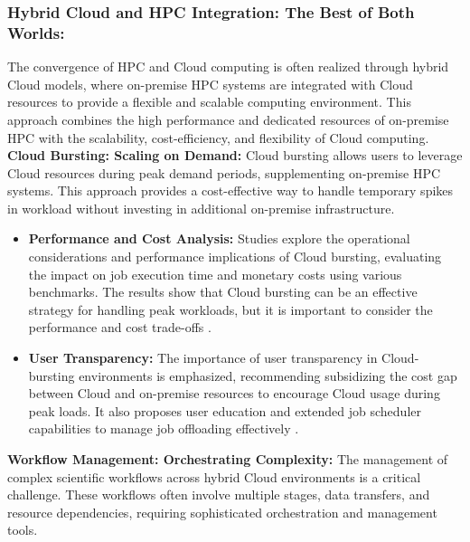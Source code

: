         





    \subsubsection{Hybrid Cloud and HPC Integration: The Best of Both Worlds:} The convergence of HPC and Cloud computing is often realized through hybrid Cloud models, where on-premise HPC systems are integrated with Cloud resources to provide a flexible and scalable computing environment. This approach combines the high performance and dedicated resources of on-premise HPC with the scalability, cost-efficiency, and flexibility of Cloud computing. \\
    \newline
    \textbf{Cloud Bursting: Scaling on Demand:} Cloud bursting allows users to leverage Cloud resources during peak demand periods, supplementing on-premise HPC systems. This approach provides a cost-effective way to handle temporary spikes in workload without investing in additional on-premise infrastructure.
    \begin{itemize}
        \item \textbf{Performance and Cost Analysis:} Studies explore the operational considerations and performance implications of Cloud bursting, evaluating the impact on job execution time and monetary costs using various benchmarks. The results show that Cloud bursting can be an effective strategy for handling peak workloads, but it is important to consider the performance and cost trade-offs \cite{netto_deciding_2015, endo_consideration_2022}.

        \item \textbf{User Transparency:} The importance of user transparency in Cloud-bursting environments is emphasized, recommending subsidizing the cost gap between Cloud and on-premise resources to encourage Cloud usage during peak loads. It also proposes user education and extended job scheduler capabilities to manage job offloading effectively \cite{endo_consideration_2022}.
    \end{itemize}

    \noindent
    \textbf{Workflow Management: Orchestrating Complexity:} The management of complex scientific workflows across hybrid Cloud environments is a critical challenge. These workflows often involve multiple stages, data transfers, and resource dependencies, requiring sophisticated orchestration and management tools.

